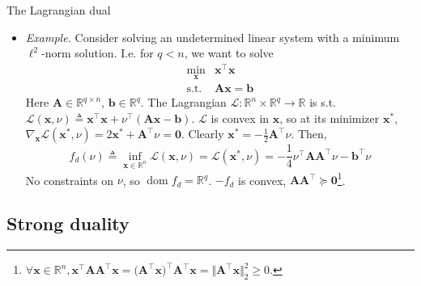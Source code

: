 \documentclass{beamer}
\numberwithin{equation}{section}
\begin{document}
\begin{frame}{The Lagrangian dual}
    \begin{itemize}
        \item
        \textit{Example.} Consider solving an undetermined linear system with
        a minimum $ \ell^2 $-norm solution. I.e. for $ q < n $, we want to
        solve
        \begin{equation*}
            \begin{array}{ll}
                \displaystyle\min_\mathbf{x} & \mathbf{x}^\top\mathbf{x} \\
                \text{s.t.} & \mathbf{Ax} = \mathbf{b}
            \end{array}
        \end{equation*}
        Here $ \mathbf{A} \in \mathbb{R}^{q \times n} $, $ \mathbf{b} \in
        \mathbb{R}^q $. The Lagrangian $ \mathcal{L} : \mathbb{R}^n \times
        \mathbb{R}^q \rightarrow \mathbb{R} $ is s.t.
        $ \mathcal{L}(\mathbf{x}, \nu) \triangleq \mathbf{x}^\top\mathbf{x} 
        + \nu^\top(\mathbf{Ax} - \mathbf{b}) $. $ \mathcal{L} $ is convex in
        $ \mathbf{x} $, so at its minimizer $ \mathbf{x}^* $,
        $ \nabla_\mathbf{x}\mathcal{L}(\mathbf{x}^*, \nu) =
        2\mathbf{x}^* + \mathbf{A}^\top\nu = \mathbf{0} $. Clearly
        $ \mathbf{x}^* = -\frac{1}{2}\mathbf{A}^\top\nu $. Then,
        \begin{equation*}
            f_d(\nu) \triangleq \inf_{\mathbf{x} \in \mathbb{R}^n}
                \mathcal{L}(\mathbf{x}, \nu) = \mathcal{L}(\mathbf{x}^*, \nu) =
                -\frac{1}{4}\nu^\top\mathbf{AA}^\top\nu - \mathbf{b}^\top\nu
        \end{equation*}
        No constraints on $ \nu $, so $ \operatorname{dom}f_d = \mathbb{R}^q $.
        $ -f_d $ is convex, $ \mathbf{AA}^\top \succeq
        \mathbf{0} $\footnote{
            $ \forall \mathbf{x} \in \mathbb{R}^n,
            \mathbf{x}^\top\mathbf{AA}^\top\mathbf{x} =
            \big(\mathbf{A}^\top\mathbf{x}\big)^\top\mathbf{A}^\top\mathbf{x} =
            \Vert\mathbf{A}^\top\mathbf{x}\Vert_2^2 \ge 0 $.
        }.
    \end{itemize}
\end{frame}

\subsection{Strong duality}
\end{document}

